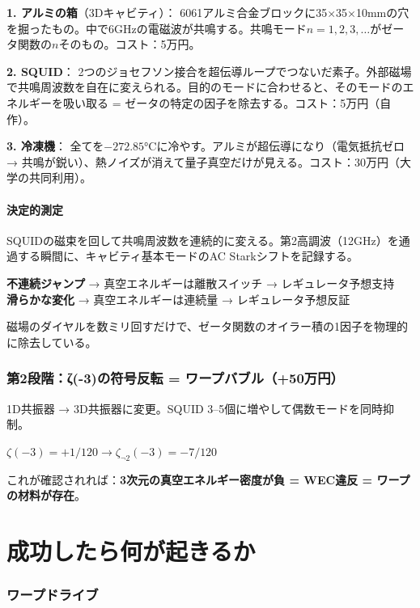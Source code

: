 \documentclass[12pt,a4paper]{article}
\begin{document}
\textbf{1. アルミの箱}（3Dキャビティ）：
6061アルミ合金ブロックに35$\times$35$\times$10mmの穴を掘ったもの。中で6GHzの電磁波が共鳴する。共鳴モード$n = 1, 2, 3, \ldots$がゼータ関数の$n$そのもの。コスト：5万円。

\textbf{2. SQUID}：
2つのジョセフソン接合を超伝導ループでつないだ素子。外部磁場で共鳴周波数を自在に変えられる。目的のモードに合わせると、そのモードのエネルギーを吸い取る = ゼータの特定の因子を除去する。コスト：5万円（自作）。

\textbf{3. 冷凍機}：
全てを$-272.85$°Cに冷やす。アルミが超伝導になり（電気抵抗ゼロ → 共鳴が鋭い）、熱ノイズが消えて量子真空だけが見える。コスト：30万円（大学の共同利用）。

\subsection{決定的測定}

SQUIDの磁束を回して共鳴周波数を連続的に変える。第2高調波（12GHz）を通過する瞬間に、キャビティ基本モードのAC Starkシフトを記録する。

\textbf{不連続ジャンプ} → 真空エネルギーは離散スイッチ → レギュレータ予想支持\\
\textbf{滑らかな変化} → 真空エネルギーは連続量 → レギュレータ予想反証

磁場のダイヤルを数ミリ回すだけで、ゼータ関数のオイラー積の1因子を物理的に除去している。

\section{第2段階：ζ(-3)の符号反転 = ワープバブル（+50万円）}

1D共振器 → 3D共振器に変更。SQUID 3--5個に増やして偶数モードを同時抑制。

$\zeta(-3) = +1/120 \to \zeta_{\neg 2}(-3) = -7/120$

これが確認されれば：\textbf{3次元の真空エネルギー密度が負 = WEC違反 = ワープの材料が存在}。

\part{成功したら何が起きるか}

\section{ワープドライブ}
\end{document}
